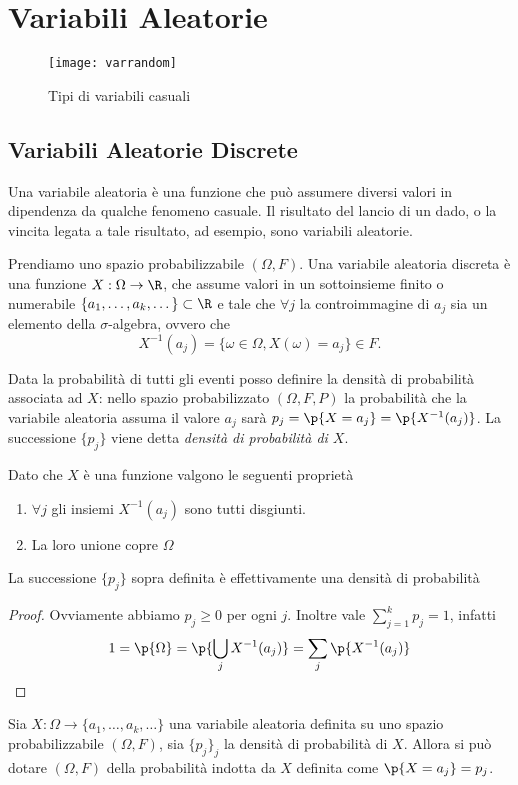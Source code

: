 \chapter{Variabili Aleatorie}

\begin{figure}[H]
    \centering
    \caption{Tipi di variabili casuali}
    \texttt{[image: varrandom]}
\end{figure}

\section{Variabili Aleatorie Discrete}


Una variabile aleatoria \`e una funzione che pu\`o  assumere diversi valori in
dipendenza da qualche fenomeno casuale. Il risultato del lancio di un dado, o la
vincita legata a tale risultato, ad esempio, sono variabili aleatorie.
\begin{defn}
    Prendiamo uno spazio probabilizzabile $ (\Omega, F) $. Una variabile
    aleatoria discreta \`e una funzione $ X : \Omega \to \R $, che assume valori
    in un sottoinsieme finito o numerabile $ \{a_1, \dots, a_k, \dots \} \subset
    \R$ e tale che $ \forall j $ la controimmagine di $a_j$ sia un elemento
    della $\sigma$-algebra, ovvero che
    $$ X^{-1}(a_j) = \{ \omega \in \Omega, X(\omega) = a_j\} \in F. $$
\end{defn}

\begin{defn}
    Data la probabilit\`a  di tutti gli eventi posso definire la densit\`a  di
    probabilit\`a associata ad $X$: nello spazio probabilizzato $ (\Omega, F, P)
    $ la probabilit\`a  che la variabile aleatoria assuma il valore $ a_j $
    sar\`a  $ p_j = \p{X = a_j} = \p{X^{-1}(a_j)} $. La successione $\{p_j\}$
    viene detta {\em densit\`a  di probabilit\`a di $X$}.
\end{defn}
Dato che $X$ \`e una funzione valgono le seguenti propriet\`a

\begin{enumerate}
    \item $ \forall j$ gli insiemi $X^{-1} (a_j) $ sono tutti disgiunti.
    \item La loro unione copre $ \Omega $
\end{enumerate}
\begin{prop}
    La successione $\{p_j\}$ sopra definita  \`e  effettivamente una densit\`a
    di probabilit\`a
\end{prop}
\begin{proof} Ovviamente abbiamo $p_j\ge0$ per ogni $j$. Inoltre vale $
\sum_{j=1}^{k} p_j = 1 $, infatti
    \begin{equation*}
        1 = \p{\Omega} = \p{\bigcup_{j} X^{-1}(a_j)} = \sum_{j} \p{X^{-1}(a_j)}
    \end{equation*}
\end{proof}
Sia $ X : \Omega \to \{ a_1, \dots, a_k ,\dots \} $ una variabile aleatoria
definita su uno spazio probabilizzabile $ (\Omega, F) $, sia $\{p_j\}_j$ la
densit\`a  di probabilit\`a di $X$. Allora si pu\`o dotare $ (\Omega, F) $ della
probabilit\`a indotta da $X$ definita come $ \p{X = a_j} = p_j $.

